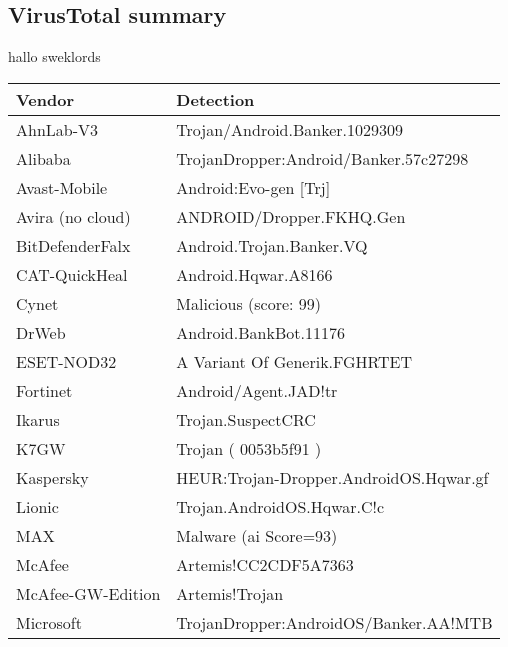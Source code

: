 \subsection{VirusTotal summary}

hallo sweklords

\begin{tabular}{|l|l|}
    \hline
    \textbf{Vendor}          & \textbf{Detection}                     \\ \hline
    AhnLab-V3                & Trojan/Android.Banker.1029309          \\ \hline
    Alibaba                  & TrojanDropper:Android/Banker.57c27298  \\ \hline
    Avast-Mobile             & Android:Evo-gen {[}Trj{]}              \\ \hline
    Avira (no cloud)         & ANDROID/Dropper.FKHQ.Gen               \\ \hline
    BitDefenderFalx          & Android.Trojan.Banker.VQ               \\ \hline
    CAT-QuickHeal            & Android.Hqwar.A8166                    \\ \hline
    Cynet                    & Malicious (score: 99)                  \\ \hline
    DrWeb                    & Android.BankBot.11176                  \\ \hline
    ESET-NOD32               & A Variant Of Generik.FGHRTET           \\ \hline
    Fortinet                 & Android/Agent.JAD!tr                   \\ \hline
    Ikarus                   & Trojan.SuspectCRC                      \\ \hline
    K7GW                     & Trojan ( 0053b5f91 )                   \\ \hline
    Kaspersky                & HEUR:Trojan-Dropper.AndroidOS.Hqwar.gf \\ \hline
    Lionic                   & Trojan.AndroidOS.Hqwar.C!c             \\ \hline
    MAX                      & Malware (ai Score=93)                  \\ \hline
    McAfee                   & Artemis!CC2CDF5A7363                   \\ \hline
    McAfee-GW-Edition        & Artemis!Trojan                         \\ \hline
    Microsoft                & TrojanDropper:AndroidOS/Banker.AA!MTB  \\ \hline

\end{tabular}
